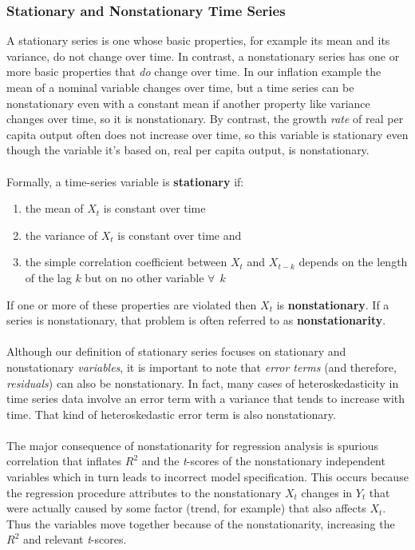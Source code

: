 \documentclass[11pt]{article}
\begin{document}
\subsubsection{Stationary and Nonstationary Time Series}
A stationary series is one whose basic properties, for example its mean and its variance, do not change over time. In contrast, a nonstationary series has one or more basic properties that \textit{do} change over time. In our inflation example the mean of a nominal variable changes over time, but a time series can be nonstationary even with a constant mean if another property like variance changes over time, so it is nonstationary. By contrast, the growth \textit{rate} of real per capita output often does not increase over time, so this variable is stationary even though the variable it's based on, real per capita output, is nonstationary.\\ \\
Formally, a time-series variable is \textbf{stationary} if:
\begin{enumerate}
\item the mean of $X_t$ is constant over time
\item the variance of $X_t$ is constant over time and
\item the simple correlation coefficient between $X_t$ and $X_{t-k}$ depends on the length of the lag $k$ but on no other variable $\forall \>\>k$
\end{enumerate}
If one or more of these properties are violated then $X_t$ is \textbf{nonstationary}. If a series is nonstationary, that problem is often referred to as \textbf{nonstationarity}.\\ \\
Although our definition of stationary series focuses on stationary and nonstationary \textit{variables}, it is important to note that \textit{error terms} (and therefore, \textit{residuals}) can also be nonstationary. In fact, many cases of heteroskedasticity in time series data involve an error term with a variance that tends to increase with time. That kind of heteroskedastic error term is also nonstationary.\\ \\
The major consequence of nonstationarity for regression analysis is spurious correlation that inflates $R^2$ and the \textit{t}-scores of the nonstationary independent variables which in turn leads to incorrect model specification. This occurs because the regression procedure attributes to the nonstationary $X_t$ changes in $Y_t$ that were actually caused by some factor (trend, for example) that also affects $X_t$. Thus the variables move together because of the nonstationarity, increasing the $R^2$ and relevant \textit{t}-scores.\\ \\
\end{document}
